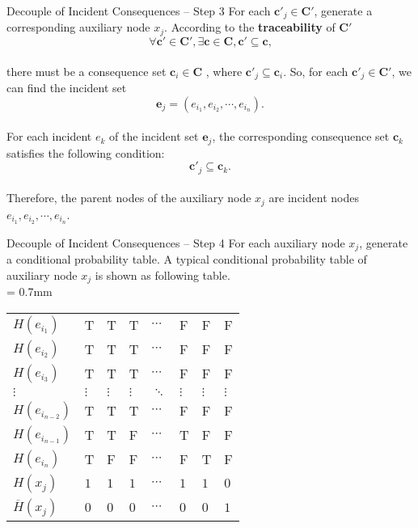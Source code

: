 \begin{frame}{Decouple of Incident Consequences -- Step 3}
     For each $\bm{c}'_j \in \bm{C}'$, generate a corresponding auxiliary node $x_j$. According to the \textbf{traceability} of $\bm{C}'$
     \[
        \forall \bm{c}' \in \bm{C}', \exists \bm{c} \in \bm{C}, \bm{c}' \subseteq \bm{c}\text{,}
     \]
     \vspace{-15pt}\\
     there must be a consequence set $\bm{c}_i \in \bm{C}$ , where $\bm{c}'_j \subseteq \bm{c}_i$. \pause So, for each $\bm{c}'_j \in \bm{C}'$, we can find the incident set
     \[
        \bm{e}_j = (e_{i_1},e_{i_2},\cdots,e_{i_n})\text{.}
     \]
     \vspace{-15pt}\\\pause
     For each incident $e_k$ of the incident set $\bm{e}_j$, the corresponding consequence set $\bm{c}_k$ satisfies the following condition:
     \[
        \bm{c}'_j \subseteq \bm{c}_k\text{.}
     \]
     \vspace{-15pt}\\\pause
     Therefore, the parent nodes of the auxiliary node $x_j$ are incident nodes $e_{i_1},e_{i_2},\cdots,e_{i_n}$.
\end{frame}

\begin{frame}{Decouple of Incident Consequences -- Step 4}
    For each auxiliary node $x_j$, generate a conditional probability table. A typical conditional probability table of auxiliary node $x_j$ is shown as following table.\\[-15pt]
    \extrarowsep = 0.7mm
    \begin{center}
      \begin{tabu}to 
        $H(e_{i_1})$        & T & T & T & $\cdots$ & F & F & F\\
        $H(e_{i_2})$        & T & T & T & $\cdots$ & F & F & F\\
        $H(e_{i_3})$        & T & T & T & $\cdots$ & F & F & F\\
        $\vdots$            & $\vdots$ & $\vdots$ & $\vdots$ & $\ddots$ & $\vdots$ & $\vdots$ & $\vdots$\\
        $H(e_{i_{n-2}})$    & T & T & T & $\cdots$ & F & F & F\\
        $H(e_{i_{n-1}})$    & T & T & F & $\cdots$ & T & F & F\\
        $H(e_{i_n})$        & T & F & F & $\cdots$ & F & T & F\\
        \hline
        $H(x_j)$            & $1$ & $1$ & $1$ & $\cdots$ & $1$ & $1$ & $0$ \\
        $\overline{H}(x_j)$ & $0$ & $0$ & $0$ & $\cdots$ & $0$ & $0$ & $1$
      \end{tabu}
    \end{center}
\end{frame}

